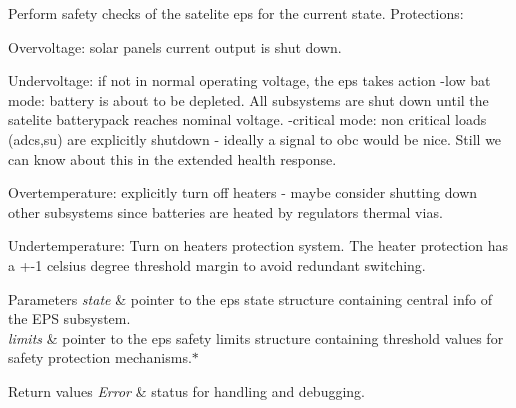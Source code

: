 Perform safety checks of the satelite eps for the current state. Protections\-: 


\begin{DoxyItemize}
\item Overvoltage\-: solar panels current output is shut down.
\item Undervoltage\-: if not in normal operating voltage, the eps takes action -\/low bat mode\-: battery is about to be depleted. All subsystems are shut down until the satelite batterypack reaches nominal voltage. -\/critical mode\-: non critical loads (adcs,su) are explicitly shutdown -\/ ideally a signal to obc would be nice. Still we can know about this in the extended health response.
\end{DoxyItemize}

Overtemperature\-: explicitly turn off heaters -\/ maybe consider shutting down other subsystems since batteries are heated by regulators thermal vias.
\begin{DoxyItemize}
\item Undertemperature\-: Turn on heaters protection system. The heater protection has a +-\/1 celsius degree threshold margin to avoid redundant switching.
\end{DoxyItemize}


\begin{DoxyParams}{Parameters}
{\em state} & pointer to the eps state structure containing central info of the E\-P\-S subsystem. \\
\hline
{\em limits} & pointer to the eps safety limits structure containing threshold values for safety protection mechanisms.$\ast$ \\
\hline
\end{DoxyParams}

\begin{DoxyRetVals}{Return values}
{\em Error} & status for handling and debugging. \\
\hline
\end{DoxyRetVals}
